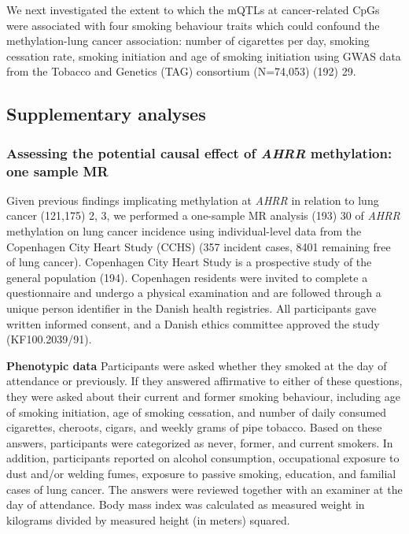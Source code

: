 \documentclass[11pt,oneside]{bristolthesis}
\begin{document}
We next investigated the extent to which the mQTLs at cancer-related CpGs were associated with four smoking behaviour traits which could confound the methylation-lung cancer association: number of cigarettes per day, smoking cessation rate, smoking initiation and age of smoking initiation using GWAS data from the Tobacco and Genetics (TAG) consortium (N=74,053) (192) 29.

\hypertarget{methods-supplementary-analyses-07}{%
\subsection{Supplementary analyses}\label{methods-supplementary-analyses-07}}

\hypertarget{assessing-the-potential-causal-effect-of-ahrr-methylation-one-sample-mr}{%
\subsubsection{\texorpdfstring{Assessing the potential causal effect of \emph{AHRR} methylation: one sample MR}{Assessing the potential causal effect of AHRR methylation: one sample MR}}\label{assessing-the-potential-causal-effect-of-ahrr-methylation-one-sample-mr}}

Given previous findings implicating methylation at \emph{AHRR} in relation to lung cancer (121,175) 2, 3, we performed a one-sample MR analysis (193) 30 of \emph{AHRR} methylation on lung cancer incidence using individual-level data from the Copenhagen City Heart Study (CCHS) (357 incident cases, 8401 remaining free of lung cancer). Copenhagen City Heart Study is a prospective study of the general population (194). Copenhagen residents were invited to complete a questionnaire and undergo a physical examination and are followed through a unique person identifier in the Danish health registries. All participants gave written informed consent, and a Danish ethics committee approved the study (KF100.2039/91).

\textbf{Phenotypic data}
Participants were asked whether they smoked at the day of attendance or previously. If they answered affirmative to either of these questions, they were asked about their current and former smoking behaviour, including age of smoking initiation, age of smoking cessation, and number of daily consumed cigarettes, cheroots, cigars, and weekly grams of pipe tobacco. Based on these answers, participants were categorized as never, former, and current smokers. In addition, participants reported on alcohol consumption, occupational exposure to dust and/or welding fumes, exposure to passive smoking, education, and familial cases of lung cancer. The answers were reviewed together with an examiner at the day of attendance. Body mass index was calculated as measured weight in kilograms divided by measured height (in meters) squared.
\end{document}
